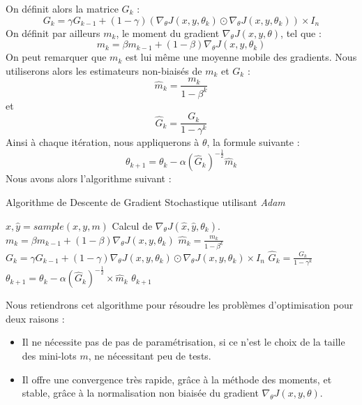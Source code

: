\documentclass[a4paper, 11pt]{report}
\begin{document}
On définit alors la matrice $G_k$ :
$$G_k = \gamma G_{k-1} + (1-\gamma)(\nabla_\theta J(x,y,\theta_k)\odot\nabla_\theta J(x,y,\theta_k)) \times I_n$$
On définit par ailleurs $m_k$, le moment du gradient $\nabla_\theta J(x,y,\theta)$, tel que :
$$m_k = \beta m_{k-1} + (1-\beta) \nabla_\theta J(x,y,\theta_k) $$
On peut remarquer que $m_k$ est lui même une moyenne mobile des gradients.
Nous utiliserons alors les estimateurs non-biaisés de $m_k$ et $G_k$ :
$$\hat{m}_k = \frac{m_k}{1-\beta^k} $$
et
$$\hat{G}_k = \frac{G_k}{1-\gamma^k}$$
Ainsi à chaque itération, nous appliquerons à $\theta$, la formule suivante :
$$\theta_{k+1} = \theta_k - \alpha (\hat{G}_k)^{-\frac{1}{2}} \hat{m}_k$$
Nous avons alors l'algorithme suivant :
\begin{algorithm}[H]
	\caption{Algorithme de Descente de Gradient Stochastique utilisant \emph{Adam}}
	\begin{algorithmic}
	    \REPEAT
	    	\STATE $\hat{x},\hat{y} = sample(x,y,m)$
	    	\STATE Calcul de $\nabla_\theta J(\hat{x},\hat{y},\theta_k)$.
	    	\STATE $m_k = \beta m_{k-1} + (1-\beta) \nabla_\theta J(x,y,\theta_k)$
	    	\STATE $\hat{m}_k = \frac{m_k}{1-\beta^k} $
	    	\STATE $G_k = \gamma G_{k-1} + (1-\gamma)\nabla_\theta J(x,y,\theta_k)\odot\nabla_\theta J(x,y,\theta_k) \times I_n$
	    	\STATE $\hat{G}_k = \frac{G_k}{1-\gamma^k}$
	    	\STATE $\theta_{k+1} = \theta_k - \alpha (\hat{G}_k)^{-\frac{1}{2}} \times \hat{m}_k$
	    \RETURN $\theta_{k+1}$
	\end{algorithmic}
\end{algorithm}
Nous retiendrons cet algorithme pour résoudre les problèmes d'optimisation pour deux raisons :
\begin{itemize}
	\item Il ne nécessite pas de pas de paramétrisation, si ce n'est le choix de la taille des mini-lots $m$, ne nécessitant peu de tests.
	\item Il offre une convergence très rapide, grâce à la méthode des moments, et stable, grâce à la normalisation non biaisée du gradient $\nabla_\theta J(x,y,\theta)$.
\end{itemize}
\end{document}
